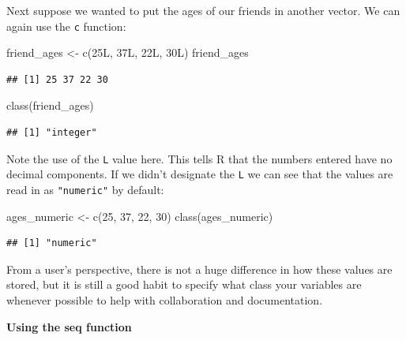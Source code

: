 \documentclass[]{tufte-book}
\newenvironment{Shaded}{\begin{snugshade}}{\end{snugshade}}
\newcommand{\DecValTok}[1]{\textcolor[rgb]{0.00,0.00,0.81}{#1}}
\newcommand{\FunctionTok}[1]{\textcolor[rgb]{0.00,0.00,0.00}{#1}}
\newcommand{\NormalTok}[1]{#1}
\newcommand{\OtherTok}[1]{\textcolor[rgb]{0.56,0.35,0.01}{#1}}
\begin{document}
Next suppose we wanted to put the ages of our friends in another vector. We can again use the \texttt{c} function:

\begin{Shaded}
\begin{Highlighting}[]
\NormalTok{friend\_ages }\OtherTok{\textless{}{-}} \FunctionTok{c}\NormalTok{(25L, 37L, 22L, 30L)}
\NormalTok{friend\_ages}
\end{Highlighting}
\end{Shaded}

\begin{verbatim}
## [1] 25 37 22 30
\end{verbatim}

\begin{Shaded}
\begin{Highlighting}[]
\FunctionTok{class}\NormalTok{(friend\_ages)}
\end{Highlighting}
\end{Shaded}

\begin{verbatim}
## [1] "integer"
\end{verbatim}

Note the use of the \texttt{L} value here. This tells R that the numbers entered have no decimal components. If we didn't designate the \texttt{L} we can see that the values are read in as \texttt{"numeric"} by default:

\begin{Shaded}
\begin{Highlighting}[]
\NormalTok{ages\_numeric }\OtherTok{\textless{}{-}} \FunctionTok{c}\NormalTok{(}\DecValTok{25}\NormalTok{, }\DecValTok{37}\NormalTok{, }\DecValTok{22}\NormalTok{, }\DecValTok{30}\NormalTok{)}
\FunctionTok{class}\NormalTok{(ages\_numeric)}
\end{Highlighting}
\end{Shaded}

\begin{verbatim}
## [1] "numeric"
\end{verbatim}

From a user's perspective, there is not a huge difference in how these values are stored, but it is still a good habit to specify what class your variables are whenever possible to help with collaboration and documentation. \newline

\vspace*{0.2in}

\noindent\textbf{Using the seq function}\vspace*{0.1in}
\end{document}

